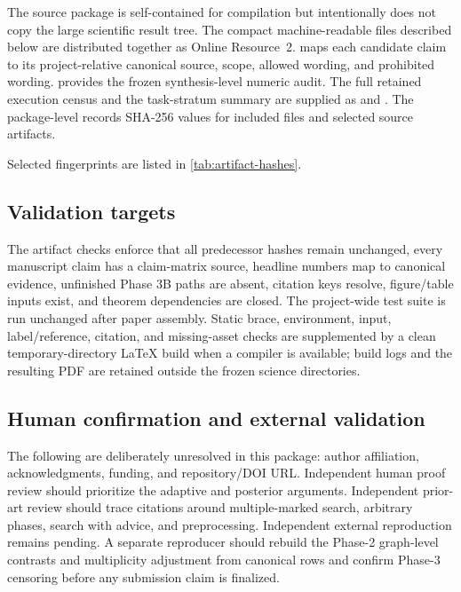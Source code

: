 The source package is self-contained for compilation but intentionally does
not copy the large scientific result tree. The compact machine-readable files
described below are distributed together as Online Resource~2.
 maps each candidate claim
to its project-relative canonical source, scope, allowed wording, and
prohibited wording.  provides the
frozen synthesis-level numeric audit. The full retained execution census and
the task-stratum summary are supplied as
 and
. The package-level
 records SHA-256 values for
included files and selected source artifacts.

Selected fingerprints are listed in \cref{tab:artifact-hashes}.


\subsection{Validation targets}

The artifact checks enforce that all predecessor hashes remain unchanged,
every manuscript claim has a claim-matrix source, headline numbers map to
canonical evidence, unfinished Phase 3B paths are absent, citation keys
resolve, figure/table inputs exist, and theorem dependencies are closed. The
project-wide test suite is run unchanged after paper assembly. Static brace,
environment, input, label/reference, citation, and missing-asset checks are
supplemented by a clean temporary-directory \LaTeX{} build when a compiler is
available; build logs and the resulting PDF are retained outside the frozen
science directories.

\subsection{Human confirmation and external validation}

The following are deliberately unresolved in this package: author
affiliation, acknowledgments, funding, and repository/DOI URL. Independent
human proof review should prioritize the adaptive and
posterior arguments. Independent prior-art review should trace citations around
multiple-marked search, arbitrary phases, search with advice, and
preprocessing. Independent external reproduction remains pending. A separate
reproducer should rebuild the Phase-2 graph-level contrasts and multiplicity
adjustment from canonical rows and confirm Phase-3 censoring before any
submission claim is finalized.

